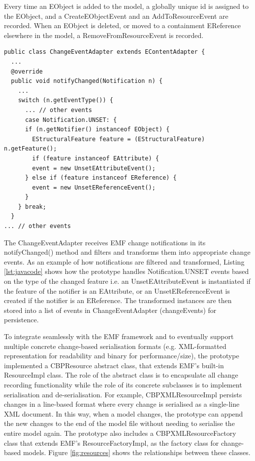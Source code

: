 Every time an \textsf{EObject} is added to the model, a globally unique id is assigned to the \textsf{EObject}, and a \textsf{CreateEObjectEvent} and an \textsf{AddToResourceEvent} are recorded. When an EObject is deleted, or moved to a containment \textsf{EReference} elsewhere in the model, a \textsf{RemoveFromResourceEvent}
is recorded.

\vspace{-20pt}
\begin{lstlisting}[style=java,caption={Simplified Java code to handle notification events.},label=lst:javacode]
public class ChangeEventAdapter extends EContentAdapter {
  ...
  @override
  public void notifyChanged(Notification n) {
    ...
    switch (n.getEventType()) {
      ... // other events
      case Notification.UNSET: {
      if (n.getNotifier() instanceof EObject) {
        EStructuralFeature feature = (EStructuralFeature) n.getFeature();
        if (feature instanceof EAttribute) {
        event = new UnsetEAttributeEvent();
      } else if (feature instanceof EReference) {
        event = new UnsetEReferenceEvent();
      }
    } break;
  } 
... // other events
\end{lstlisting}	

The \textsf{ChangeEventAdapter} receives EMF change notifications in its \textsf{notifyChanged()} method and filters and transforms them into appropriate change events. As an example of how notifications are filtered and transformed, Listing \ref{lst:javacode} shows how the prototype handles \textsf{Notification.UNSET} events based on the type of the changed feature i.e. an \textsf{UnsetEAttributeEvent} is instantiated if the feature of the notifier is an \textsf{EAttribute}, or an \textsf{UnsetEReferenceEvent}  is created if the notifier is an \textsf{EReference}. The transformed instances are then stored into a list of events in \textsf{ChangeEventAdapter} (\textsf{changeEvents}) for persistence. 

To integrate seamlessly with the EMF framework and to eventually support multiple concrete change-based serialisation formats (e.g. XML-formatted representation for readability and binary for performance/size), the prototype implemented a \textsf{CBPResource} abstract class, that extends EMF's built-in \textsf{ResourceImpl} class. The role of the abstract class is to encapsulate all change recording functionality while the role of its concrete subclasses is to implement serialisation and de-serialisation. For example, \textsf{CBPXMLResourceImpl} persists changes in a line-based format where every change is serialised as a single-line XML document. In this way, when a model changes, the prototype can append the new changes to the end of the model file without needing to serialise the entire model again. The prototype also includes a \textsf{CBPXMLResourceFactory} class that extends EMF's \textsf{ResourceFactoryImpl}, as the factory class for change-based models. Figure \ref{fig:resources} shows the relationships between these classes.

